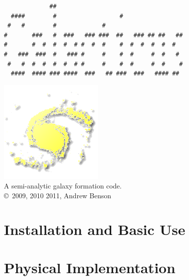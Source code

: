 \documentclass[letterpaper,10pt]{book}
\begin{document}
\lstset{language=[95]Fortran}

\frontmatter

\pagestyle{empty}
\begin{center}
\begin{minipage}{9.5cm}
\begin{verbatim}
             ##                                     
  ####        #                  #                  
 #   #        #             #                       
#       ###   #  ###   ### ###  ##   ### ## ##   ## 
#       #  #  #  #  # #  #  #    #  #  #  #  #  #   
#   ###  ###  #   ### #     #    #  #     #  #   #  
 #   #  #  #  #  #  # #     #    #  #     #  #    # 
  ####  #### ### ####  ###   ## ###  ###   #### ##  

\end{verbatim}
\end{minipage}

\includegraphics{New_Logo_Galaxy_192_Transparent.png}\\
A semi-analytic galaxy formation code.\\

\copyright\ 2009, 2010 2011, Andrew Benson
\end{center}

\tableofcontents

\mainmatter

\part{Installation and Basic Use}













\part{Physical Implementation}
\end{document}
